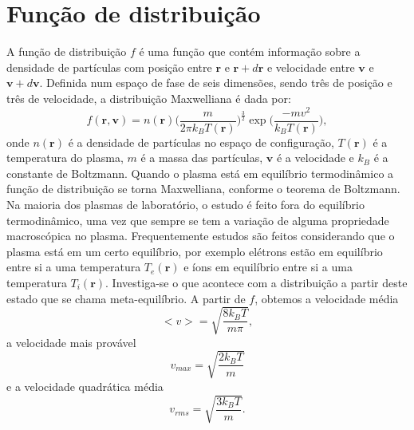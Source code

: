 \documentclass[12pt,oneside,a4paper]{abntex2}
\begin{document}
\section{Função de distribuição}
\noindent A função de distribuição $f$ é uma função que contém informação sobre a densidade de partículas com posição entre $\bm{r}$ e $\bm{r}+d\bm{r}$ e velocidade entre $\bm{v}$ e $\bm{v}+d\bm{v}$. Definida num espaço de fase de seis dimensões, sendo três de posição e três de velocidade, a distribuição Maxwelliana \cite[pg. 127]{bittencourt} é dada por:
\begin{equation}
\label{distmax}
    f(\bm{r}, \bm{v}) = n(\bm{r}) \Big(\frac{m}{2\pi k_B T(\bm{r})}\Big)^{\frac{3}{2}}\exp\Big(\frac{-mv^2}{k_B T(\bm{r})}\Big),
\end{equation}
onde $n(\bm{r})$ é a densidade de partículas no espaço de configuração, $T(\bm{r})$ é a temperatura do plasma, $m$ é a massa das partículas, $\bm{v}$ é a velocidade e $k_B$ é a constante de Boltzmann. Quando o plasma está em equilíbrio termodinâmico a função de distribuição se torna Maxwelliana, conforme o teorema de Boltzmann.
Na maioria dos plasmas de laboratório, o estudo é feito fora do equilíbrio termodinâmico, uma vez que sempre se tem a variação de alguma propriedade macroscópica no plasma. Frequentemente estudos são feitos considerando que o plasma está em um certo equilíbrio, por exemplo elétrons estão em equilíbrio entre si a uma temperatura $T_e(\bm{r})$ e íons em equilíbrio entre si a uma temperatura $T_i(\bm{r})$. Investiga-se o que acontece com a distribuição a partir deste estado que se chama meta-equilíbrio.
A partir de $f$, obtemos a velocidade média
\begin{equation}
    <v> = \sqrt{\frac{8k_BT}{m\pi}},
    \end{equation} 
 a velocidade mais provável 
\begin{equation}
   v_{max}=\sqrt{\frac{2k_BT}{m}}
   \end{equation}   
e a velocidade quadrática média
\begin{equation}
   v_{rms}=\sqrt{\frac{3k_BT}{m}}.
   \end{equation} 
\end{document}

